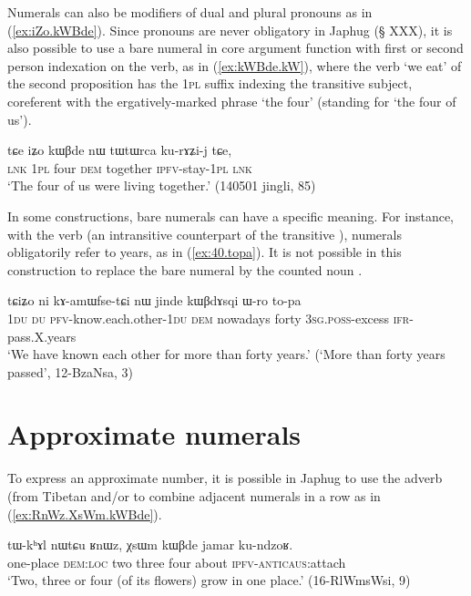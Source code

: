Numerals can also be modifiers of dual and plural pronouns as in (\ref{ex:iZo.kWBde}). Since pronouns are never obligatory in Japhug (§ XXX), it is also possible to use a bare numeral in core argument function with first or second person indexation on the verb, as in (\ref{ex:kWBde.kW}), where the verb  `we eat' of the second proposition has the \textsc{1pl}  suffix indexing the transitive subject, coreferent with the ergatively-marked phrase  `the four' (standing for  `the four of us').

\begin{exe}
\ex \label{ex:iZo.kWBde} 
\gll tɕe iʑo kɯβde nɯ tɯtɯrca ku-rɤʑi-j tɕe, \\
\textsc{lnk} \textsc{1pl} four \textsc{dem}  together \textsc{ipfv}-stay-\textsc{1pl} \textsc{lnk} \\
\glt `The four of us were living together.' (140501 jingli, 85)
\end{exe}		

In some constructions, bare numerals can have a specific meaning. For instance, with the verb  (an intransitive counterpart of the transitive ), numerals obligatorily refer to years, as in (\ref{ex:40.topa}). It is not possible in this construction to replace the bare numeral by the counted noun  .

\begin{exe}
\ex \label{ex:40.topa} 
\gll tɕiʑo ni kɤ-amɯfse-tɕi nɯ jinde kɯβdɤsqi ɯ-ro to-pa \\
\textsc{1du} \textsc{du} \textsc{pfv}-know.each.other-\textsc{1du} \textsc{dem} nowadays forty \textsc{3sg.poss}-excess \textsc{ifr}-pass.X.years \\
\glt  `We have known each other for more than forty years.' (`More than forty years passed', 12-BzaNsa, 3)
 \end{exe}		
  
\section{Approximate numerals} \label{sec:approx.numerals}
To express an approximate number, it is possible in Japhug to use the adverb  (from Tibetan  and/or to combine adjacent numerals in a row as in (\ref{ex:RnWz.XsWm.kWBde}).

\begin{exe}
\ex \label{ex:RnWz.XsWm.kWBde}
\gll tɯ-kʰɤl nɯtɕu ʁnɯz, χsɯm kɯβde jamar ku-ndzoʁ. \\
one-place \textsc{dem}:\textsc{loc} two three four about \textsc{ipfv}-\textsc{anticaus}:attach \\
\glt `Two, three or four (of its flowers) grow in one place.' (16-RlWmsWsi, 9)
\end{exe}

